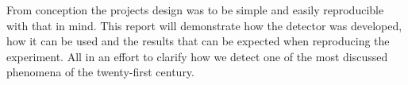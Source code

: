 From conception the projects design was to be simple and easily reproducible with that in mind. This report will demonstrate how the detector was developed, how it can be used and the results that can be expected when reproducing the experiment. All in an effort to clarify how we detect one of the most discussed phenomena of the twenty-first century.